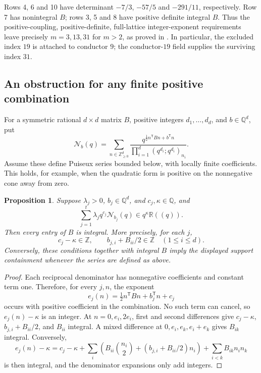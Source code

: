 \documentclass[11pt,reqno]{amsart}
\newcommand{\QQ}{\mathbb Q}
\newcommand{\ZZ}{\mathbb Z}
\newcommand{\RR}{\mathbb R}
\newtheorem{proposition}[theorem]{Proposition}
\theoremstyle{remark}
\numberwithin{equation}{section}
\begin{document}
Rows 4, 6 and 10 have determinant $-7/3$, $-57/5$ and $-291/11$,
respectively. Row 7 has nonintegral $B$; rows 3, 5 and 8 have positive
definite integral $B$. Thus the positive-coupling, positive-definite,
full-lattice integer-exponent requirements leave precisely $m=3,13,31$
for $m>2$, as proved in \cite[Theorem~5.1]{Brown}.
In particular, the excluded index $19$ is attached to conductor $9$;
the conductor-$19$ field supplies the surviving index $31$.

\subsection{An obstruction for any finite positive combination}
For a symmetric rational $d\times d$ matrix $B$, positive integers
$d_1,\ldots,d_d$, and $b\in\QQ^d$, put
\[
 \mathcal N_b(q)=\sum_{n\in\ZZ_{\geq0}^d}
 \frac{q^{\frac12n^{\mathsf T}Bn+b^{\mathsf T}n}}
 {\prod_{i=1}^d(q^{d_i};q^{d_i})_{n_i}}.
\]
Assume these define Puiseux series bounded below, with locally finite
coefficients. This holds, for example, when the quadratic form is
positive on the nonnegative cone away from zero.

\begin{proposition}\label{prop:support}
Suppose $\lambda_j>0$, $b_j\in\QQ^d$, and $c_j,\kappa\in\QQ$, and
\[
 \sum_{j=1}^t\lambda_jq^{c_j}\mathcal N_{b_j}(q)\in q^\kappa\RR((q)).
\]
Then every entry of $B$ is integral. More precisely, for each $j$,
\[
 c_j-\kappa\in\ZZ,\qquad b_{j,i}+B_{ii}/2\in\ZZ\quad(1\leq i\leq d).
\]
Conversely, these conditions together with integral $B$ imply the
displayed support containment whenever the series are defined as above.
\end{proposition}
\begin{proof}
Each reciprocal denominator has nonnegative coefficients and constant
term one. Therefore, for every $j,n$, the exponent
\[
 e_j(n)=\tfrac12n^{\mathsf T}Bn+b_j^{\mathsf T}n+c_j
\]
occurs with positive coefficient in the combination. No such term can
cancel, so $e_j(n)-\kappa$ is an integer. At $n=0,e_i,2e_i$, first and
second differences give $c_j-\kappa$, $b_{j,i}+B_{ii}/2$, and $B_{ii}$
integral. A mixed difference at $0,e_i,e_k,e_i+e_k$ gives $B_{ik}$
integral. Conversely,
\[
 e_j(n)-\kappa=c_j-\kappa+
 \sum_i\left(B_{ii}\binom{n_i}{2}+(b_{j,i}+B_{ii}/2)n_i\right)
 +\sum_{i<k}B_{ik}n_in_k
\]
is then integral, and the denominator expansions only add integers.
\end{proof}
\end{document}
